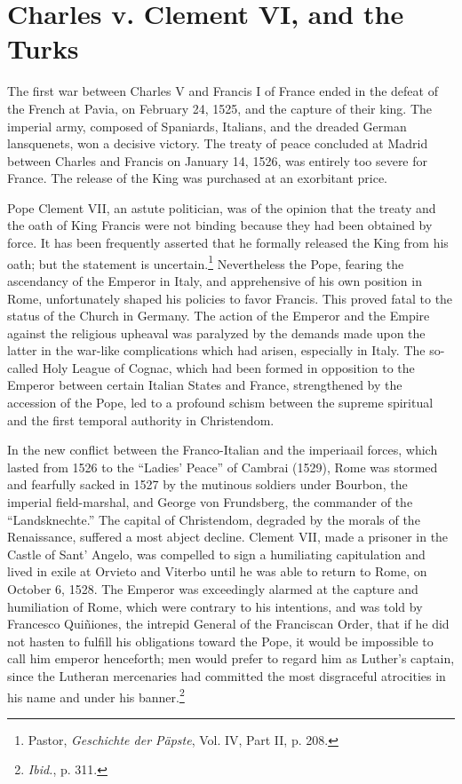 \section{Charles v. Clement VI, and the Turks}

The first war between Charles V and Francis I of France ended in
the defeat of the French at Pavia, on February 24, 1525, and the capture
of their king. The imperial army, composed of Spaniards, Italians,
and the dreaded German lansquenets, won a decisive victory. The
treaty of peace concluded at Madrid between Charles and Francis on
January 14, 1526, was entirely too severe for France. The release of
the King was purchased at an exorbitant price.

Pope Clement VII, an astute politician, was of the opinion that the
treaty and the oath of King Francis were not binding because they
had been obtained by force. It has been frequently asserted that he
formally released the King from his oath; but the statement is uncertain.\footnote
{Pastor, \textit{Geschichte der Päpste}, Vol. IV, Part II, p. 208.}
Nevertheless the Pope, fearing the ascendancy of the Emperor
in Italy, and apprehensive of his own position in Rome, unfortunately
shaped his policies to favor Francis. This proved fatal to the
status of the Church in Germany. The action of the Emperor and the
Empire against the religious upheaval was paralyzed by the demands
made upon the latter in the war-like complications which had arisen,
especially in Italy. The so-called Holy League of Cognac, which had
been formed in opposition to the Emperor between certain Italian
States and France, strengthened by the accession of the Pope, led to
a profound schism between the supreme spiritual and the first temporal
authority in Christendom.

In the new conflict between the Franco-Italian and the imperiaail
forces, which lasted from 1526 to the “Ladies’ Peace” of Cambrai
(1529), Rome was stormed and fearfully sacked in 1527 by the mutinous
soldiers under Bourbon, the imperial field-marshal, and George
von Frundsberg, the commander of the ``Landsknechte.'' The capital
of Christendom, degraded by the morals of the Renaissance, suffered
a most abject decline. Clement VII, made a prisoner in the Castle of
Sant’ Angelo, was compelled to sign a humiliating capitulation and
lived in exile at Orvieto and Viterbo until he was able to return to
Rome, on October 6, 1528. The Emperor was exceedingly alarmed
at the capture and humiliation of Rome, which were contrary to his
intentions, and was told by Francesco Quiñiones, the intrepid General
of the Franciscan Order, that if he did not hasten to fulfill his obligations
toward the Pope, it would be impossible to call him emperor
henceforth; men would prefer to regard him as Luther’s captain,
since the Lutheran mercenaries had committed the most disgraceful
atrocities in his name and under his banner.\footnote{\textit{Ibid.}, p. 311.}

